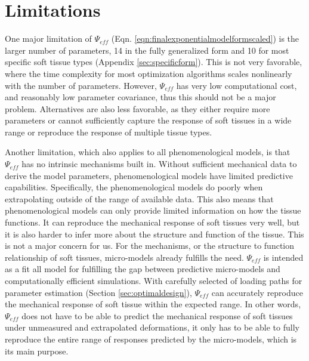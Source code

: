 

\section{Limitations} 
	
    One major limitation of $\Psi_{eff}$ (Eqn. \ref{eqn:finalexponentialmodelformscaled}) is the larger number of parameters, 14 in the fully generalized form and 10 for most specific soft tissue types (Appendix \ref{sec:specificform}). This is not very favorable, where the time complexity for most optimization algorithms scales nonlinearly with the number of parameters. However, $\Psi_{eff}$ has very low computational cost, and reasonably low parameter covariance, thus this should not be a major problem. Alternatives are also less favorable, as they either require more parameters or cannot sufficiently capture the response of soft tissues in a wide range or reproduce the response of multiple tissue types. 
    
    Another limitation, which also applies to all phenomenological models, is that $\Psi_{eff}$ has no intrinsic mechanisms built in. Without sufficient mechanical data to derive the model parameters, phenomenological models have limited predictive capabilities. Specifically, the phenomenological models do poorly when extrapolating outside of the range of available data. This also means that phenomenological models can only provide limited information on how the tissue functions. It can reproduce the mechanical response of soft tissues very well, but it is also harder to infer more about the structure and function of the tissue. This is not a major concern for us. For the mechanisms, or the structure to function relationship of soft tissues, micro-models already fulfills the need. $\Psi_{eff}$ is intended as a fit all model for fulfilling the gap between predictive micro-models and computationally efficient simulations. With carefully selected of loading paths for parameter estimation (Section \ref{sec:optimaldesign}), $\Psi_{eff}$ can accurately reproduce the mechanical response of soft tissue within the expected range. In other words, $\Psi_{eff}$ does not have to be able to predict the mechanical response of soft tissues under unmeasured and extrapolated deformations, it only has to be able to fully reproduce the entire range of responses predicted by the micro-models, which is its main purpose. 



